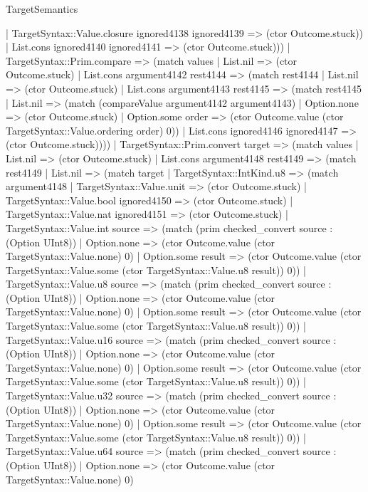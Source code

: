\begin{lexlean}{TargetSemantics}
\begin{semanticmodule}
{          | TargetSyntax::Value.closure ignored4138 ignored4139 => (ctor Outcome.stuck))
        | List.cons ignored4140 ignored4141 => (ctor Outcome.stuck)))
    | TargetSyntax::Prim.compare => (match values
      | List.nil => (ctor Outcome.stuck)
      | List.cons argument4142 rest4144 => (match rest4144
        | List.nil => (ctor Outcome.stuck)
        | List.cons argument4143 rest4145 => (match rest4145
          | List.nil => (match (compareValue argument4142 argument4143)
            | Option.none => (ctor Outcome.stuck)
            | Option.some order => (ctor Outcome.value (ctor TargetSyntax::Value.ordering order) 0))
          | List.cons ignored4146 ignored4147 => (ctor Outcome.stuck))))
    | TargetSyntax::Prim.convert target => (match values
      | List.nil => (ctor Outcome.stuck)
      | List.cons argument4148 rest4149 => (match rest4149
        | List.nil => (match target
          | TargetSyntax::IntKind.u8 => (match argument4148
            | TargetSyntax::Value.unit => (ctor Outcome.stuck)
            | TargetSyntax::Value.bool ignored4150 => (ctor Outcome.stuck)
            | TargetSyntax::Value.nat ignored4151 => (ctor Outcome.stuck)
            | TargetSyntax::Value.int source => (match (prim checked_convert source : (Option UInt8))
              | Option.none => (ctor Outcome.value (ctor TargetSyntax::Value.none) 0)
              | Option.some result => (ctor Outcome.value (ctor TargetSyntax::Value.some (ctor TargetSyntax::Value.u8 result)) 0))
            | TargetSyntax::Value.u8 source => (match (prim checked_convert source : (Option UInt8))
              | Option.none => (ctor Outcome.value (ctor TargetSyntax::Value.none) 0)
              | Option.some result => (ctor Outcome.value (ctor TargetSyntax::Value.some (ctor TargetSyntax::Value.u8 result)) 0))
            | TargetSyntax::Value.u16 source => (match (prim checked_convert source : (Option UInt8))
              | Option.none => (ctor Outcome.value (ctor TargetSyntax::Value.none) 0)
              | Option.some result => (ctor Outcome.value (ctor TargetSyntax::Value.some (ctor TargetSyntax::Value.u8 result)) 0))
            | TargetSyntax::Value.u32 source => (match (prim checked_convert source : (Option UInt8))
              | Option.none => (ctor Outcome.value (ctor TargetSyntax::Value.none) 0)
              | Option.some result => (ctor Outcome.value (ctor TargetSyntax::Value.some (ctor TargetSyntax::Value.u8 result)) 0))
            | TargetSyntax::Value.u64 source => (match (prim checked_convert source : (Option UInt8))
              | Option.none => (ctor Outcome.value (ctor TargetSyntax::Value.none) 0)
}
\end{semanticmodule}
\end{lexlean}
